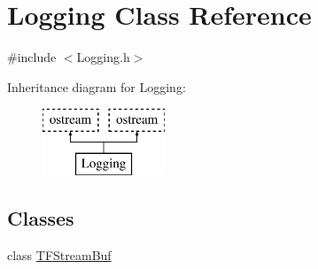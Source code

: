 \hypertarget{classLogging}{\section{Logging Class Reference}
\label{classLogging}
}


{\ttfamily \#include $<$Logging.\-h$>$}

Inheritance diagram for Logging\-:\begin{figure}[H]
\begin{center}
\leavevmode
\includegraphics[height=2.000000cm]{classLogging}
\end{center}
\end{figure}
\subsection*{Classes}
\begin{DoxyCompactItemize}
\item 
class \hyperlink{classLogging_1_1TFStreamBuf}{T\-F\-Stream\-Buf}
\end{DoxyCompactItemize}
